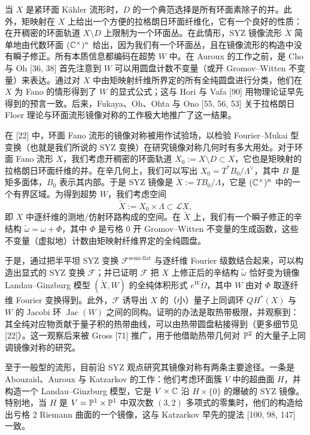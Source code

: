 当 $X$ 是紧环面 K\"ahler 流形时，$D$ 的一个典范选择是所有环面素除子的并。此外，矩映射在 $X$ 上给出一个方便的拉格朗日环面纤维化，它有一个良好的性质：在开稠密的环面轨道 $X \setminus D$ 上限制为一个环面丛。在此情形，SYZ 镜像流形 $\check X$ 简单地由代数环面 $(\mathbb{C}^\times)^n$ 给出，因为我们有一个环面丛，且在镜像流形的构造中没有瞬子修正。所有本质信息都编码在超势 $W$ 中。在 Auroux 的工作之前，是 Cho 与 Oh [36, 38] 首先注意到 $W$ 可以用圆盘计数不变量（或开 Gromov--Witten 不变量）来表达。通过对 $X$ 中由矩映射纤维所界定的所有全纯圆盘进行分类，他们在 $X$ 为 Fano 的情形得到了 $W$ 的显式公式；这与 Hori 与 Vafa [90] 用物理论证早先得到的预言一致。后来，Fukaya、Oh、Ohta 与 Ono [55, 56, 53] 关于拉格朗日 Floer 理论与环面流形镜像对称的工作极大地推广了这一结果。

在 [22] 中，环面 Fano 流形的镜像对称被用作试验场，以检验 Fourier--Mukai 型变换（也就是我们所说的 SYZ 变换）在研究镜像对称几何时有多大用处。对于环面 Fano 流形 $X$，我们考虑开稠密的环面轨道 $X_0 := X \setminus D \subset X$，它也是矩映射的拉格朗日环面纤维的并。在辛几何上，我们可以写出 $X_0 = T^*B_0/\Lambda^\vee$，其中 $B$ 是矩多面体，$B_0$ 表示其内部。于是 SYZ 镜像是 $\check X := TB_0/\Lambda$，它是 $(\mathbb{C}^\times)^n$ 中的一个有界区域。为得到超势 $W$，我们考虑空间
\[
  \tilde X := X_0 \times \Lambda \subset \mathcal{L}X,
\]
即 $X$ 中逐纤维的测地/仿射环路构成的空间。在 $\tilde X$ 上，我们有一个瞬子修正的辛结构 $\tilde\omega = \omega + \Phi$，其中 $\Phi$ 是亏格 0 开 Gromov--Witten 不变量的生成函数，这些不变量（虚拟地）计数由矩映射纤维界定的全纯圆盘。

于是，通过把半平坦 SYZ 变换 $\mathcal{F}^{\text{semi-flat}}$ 与逐纤维 Fourier 级数结合起来，可以构造出显式的 SYZ 变换 $\mathcal{F}$；并已证明 $\mathcal{F}$ 把 $X$ 上修正后的辛结构 $\tilde\omega$ 恰好变为镜像 Landau--Ginzburg 模型 $(\check X,W)$ 的全纯体积形式 $e^{W}\check\Omega$，其中 $W$ 由对 $\Phi$ 取逐纤维 Fourier 变换得到。此外，$\mathcal{F}$ 诱导出 $X$ 的（小）量子上同调环 $QH^*(X)$ 与 $W$ 的 Jacobi 环 $\operatorname{Jac}(W)$ 之间的同构。证明的办法是取热带极限，并观察到：其全纯对应物贡献于量子积的热带曲线，可以由热带圆盘粘接得到（更多细节见 [22]）。这一观察后来被 Gross [71] 推广，用于他借助热带几何对 $\mathbb{P}^2$ 的大量子上同调镜像对称的研究。

至于一般型的流形，目前沿 SYZ 观点研究其镜像对称有两条主要途径。一条是 Abouzaid、Auroux 与 Katzarkov 的工作：他们考虑环面簇 $V$ 中的超曲面 $H$，并构造一个 Landau--Ginzburg 模型，它是 $V \times \mathbb{C}$ 沿 $H \times \{0\}$ 的爆破的 SYZ 镜像。特别地，当 $H$ 是 $V = \mathbb{P}^1 \times \mathbb{P}^1$ 中双次数 $(3,2)$ 多项式的零集时，他们的构造给出亏格 2 Riemann 曲面的一个镜像，这与 Katzarkov 早先的提法 [100, 98, 147] 一致。

